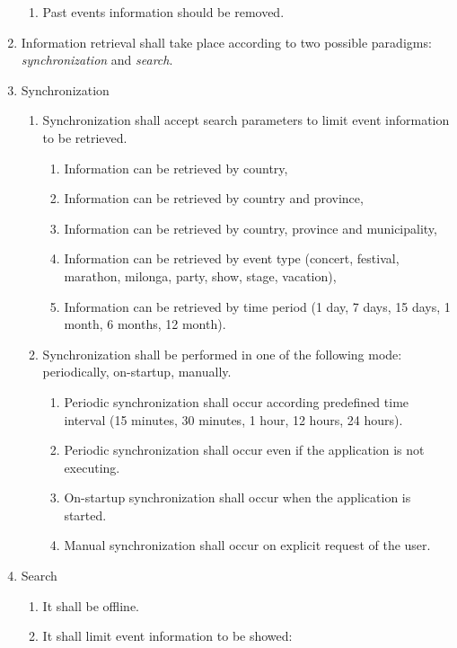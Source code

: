 \documentclass[12pt, twoside]{article}
\begin{document}
\begin{enumerate}
\begin{enumerate}
	        		\item Past events information should be removed.
    		\end{enumerate}
    	\item Information retrieval shall take place according to two possible 
          	paradigms: \emph{synchronization} and \emph{search}.
    	\item Synchronization
    		\begin{enumerate}
        			\item Synchronization shall accept search parameters to limit event information to be retrieved.
        				\begin{enumerate}
            				\item Information can be retrieved by country,
					\item	Information can be retrieved by country and province,
					\item	Information can be retrieved by country, province and municipality,
					\item	Information can be retrieved by event type (concert, festival, marathon, milonga, party, show, stage, vacation),
					\item	Information can be retrieved by time period (1 day, 7 days, 15 days, 1 month, 6 months, 12 month).
        				\end{enumerate}
        			\item Synchronization shall be performed in one of the following mode:
              			periodically, on-startup, manually.
				\begin{enumerate}
					\item Periodic synchronization shall occur according 
						predefined time interval (15 minutes, 30 minutes, 1 hour, 12 hours, 24 hours).
					\item Periodic synchronization shall occur even if the application is not executing.
            				\item On-startup synchronization shall occur when the application is started.
					\item Manual synchronization shall occur on explicit request of the user.
				\end{enumerate}
		\end{enumerate}
	\item Search
    		\begin{enumerate}
        			\item It shall be offline.
			\item It shall limit event information to be showed:

\end{enumerate}
\end{enumerate}
\end{document}
